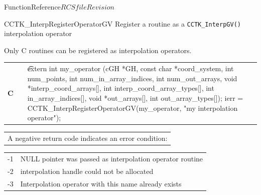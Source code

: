 \begin{cactuspart}{FunctionReference}{$RCSfile$}{$Revision$}

\begin{CCTKFunc}{CCTK\_InterpRegisterOperatorGV}%
{Register a routine as a {\tt CCTK\_InterpGV()} interpolation operator}
\label{CCTK-InterpRegisterOperatorGV}
\showcargs
\begin{params}
\end{params}
\begin{discussion}
Only C routines can be registered as interpolation operators.
\end{discussion}
\begin{examples}
\begin{tabular}{@{}p{3cm}cp{11cm}}
\hfill {\bf C} && {\t
extern int my\_operator (cGH *GH,\vfill
\hspace{29ex}const char *coord\_system,\vfill
\hspace{29ex}int num\_points,\vfill
\hspace{29ex}int num\_in\_array\_indices,\vfill
\hspace{29ex}int num\_out\_arrays,\vfill
\hspace{29ex}void *interp\_coord\_arrays[],\vfill
\hspace{29ex}int interp\_coord\_array\_types[],\vfill
\hspace{29ex}int in\_array\_indices[],\vfill
\hspace{29ex}void *out\_arrays[],\vfill
\hspace{29ex}int out\_array\_types[]);\linebreak
ierr = CCTK\_InterpRegisterOperatorGV(my\_operator,\vfill
\hspace{2ex}"my interpolation operator");}
\\
\end{tabular}
\end{examples}
\begin{errorcodes}
\begin{tabular}{l}
A negative return code indicates an error condition:
\end{tabular}
\begin{tabular}{ll}
-1 & NULL pointer was passed as interpolation operator routine\\
-2 & interpolation handle could not be allocated\\
-3 & Interpolation operator with this name already exists\\
\end{tabular}
\end{errorcodes}
\end{CCTKFunc}


\end{cactuspart}
